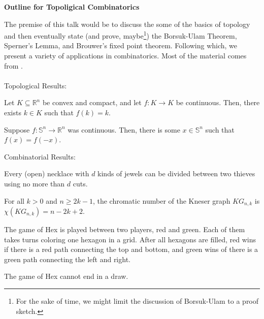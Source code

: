 \documentclass{beanSET}
\begin{document}
\begin{center}
\huge \textbf{Outline for Topoligical Combinatorics}
\end{center}

The premise of this talk would be to discuss the some of the basics of topology and then eventually state (and prove, maybe\footnote{For the sake of time, we might limit the discussion of Borsuk-Ulam to a proof sketch.}) the Borsuk-Ulam Theorem, Sperner's Lemma, and Brouwer's fixed point theorem. Following which, we present a variety of applications in combinatorics. Most of the material comes from \cite{topcombi}.\\
\\

Topological Results:

\begin{theorem}
    Let $K \subseteq \mathbb R^n$ be convex and compact, and let $f: K \to K$ be continuous. Then, there exists $k \in K$ such that $f(k) = k$.
\end{theorem}

\begin{theorem}
    Suppose $f: \mathbb S^n \to \mathbb R^n$ was continuous. Then, there is some $x \in \mathbb S^n$ such that $f(x) = f(-x)$.
\end{theorem}

Combinatorial Results:

\begin{theorem}
    Every (open) necklace with $d$ kinds of jewels can be divided between two thieves using no more than $d$ cuts.
\end{theorem}

\begin{theorem}
    For all $k > 0$ and $n \geq 2k - 1$, the chromatic number of the Kneser graph $KG_{n,k}$ is $\chi(KG_{n,k}) = n - 2k + 2$.
\end{theorem}

The game of Hex is played between two players, red and green. Each of them takes turns coloring one hexagon in a grid. After all hexagons are filled, red wins if there is a red path connecting the top and bottom, and green wins of there is a green path connecting the left and right.

\begin{theorem}
    The game of Hex cannot end in a draw.
\end{theorem}


\vfill



\end{document}
